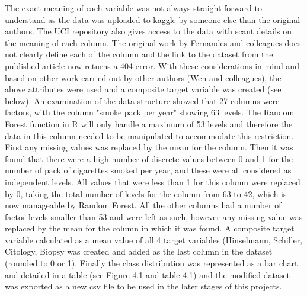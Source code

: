 The exact meaning of each variable was not always straight forward to understand as the data was uploaded to kaggle by someone else than the original authors. The UCI repository also gives access to the data with scant details on the meaning of each column. The original work by Fernandes and colleagues \cite{Fernandes:2017td} does not clearly define each of the column and the link to the dataset from the published article now returns a 404 error. With these considerations in mind and based on other work carried out by other authors (Wen and colleagues), the above attributes were used and a composite target variable was created (see below).
An examination of the data structure showed that 27 columns were factors, with the column "smoke pack per year" showing 63 levels. The Random Forest function in R will only handle a maximum of 53 levels and therefore the data in this column needed to be manipulated to accommodate this restriction. First any missing values was replaced by the mean for the column. Then it was found that there were a high number of discrete values between 0 and 1 for the number of pack of cigarettes smoked per year, and these were all considered as independent levels. All values that were less than 1 for this column were replaced by 0, taking the total number of levels for the column from 63 to 42, which is now manageable by Random Forest.
All the other columns had a number of factor levels smaller than 53 and were left as such, however any missing value was replaced by the mean for the column in which it was found.
A composite target variable calculated as a mean value of all 4 target variables (Hinselmann, Schiller, Citology, Biopsy was created and added as the last column in the dataset (rounded to 0 or 1).
Finally the class distribution was represented as a bar chart and detailed in a table (see Figure 4.1 and table 4.1) and the modified dataset was exported as a new csv file to be used in the later stages of this projects.

